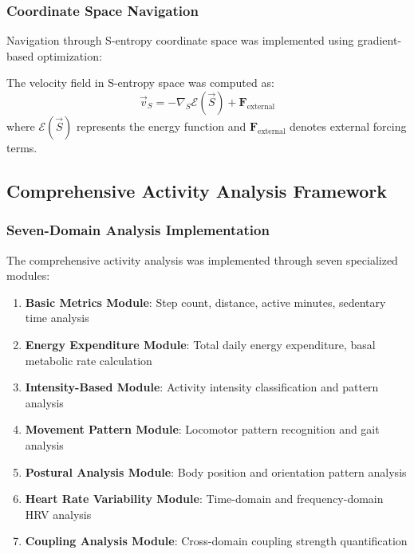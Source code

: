 \subsubsection{Coordinate Space Navigation}

Navigation through S-entropy coordinate space was implemented using gradient-based optimization:

\begin{definition}
The velocity field in S-entropy space was computed as:
\begin{equation}
\vec{v}_S = -\nabla_S \mathcal{E}(\vec{S}) + \mathbf{F}_{\text{external}}
\end{equation}
where $\mathcal{E}(\vec{S})$ represents the energy function and $\mathbf{F}_{\text{external}}$ denotes external forcing terms.
\end{definition}

\subsection{Comprehensive Activity Analysis Framework}

\subsubsection{Seven-Domain Analysis Implementation}

The comprehensive activity analysis was implemented through seven specialized modules:

\begin{enumerate}
\item \textbf{Basic Metrics Module}: Step count, distance, active minutes, sedentary time analysis
\item \textbf{Energy Expenditure Module}: Total daily energy expenditure, basal metabolic rate calculation
\item \textbf{Intensity-Based Module}: Activity intensity classification and pattern analysis
\item \textbf{Movement Pattern Module}: Locomotor pattern recognition and gait analysis
\item \textbf{Postural Analysis Module}: Body position and orientation pattern analysis
\item \textbf{Heart Rate Variability Module}: Time-domain and frequency-domain HRV analysis
\item \textbf{Coupling Analysis Module}: Cross-domain coupling strength quantification
\end{enumerate}

